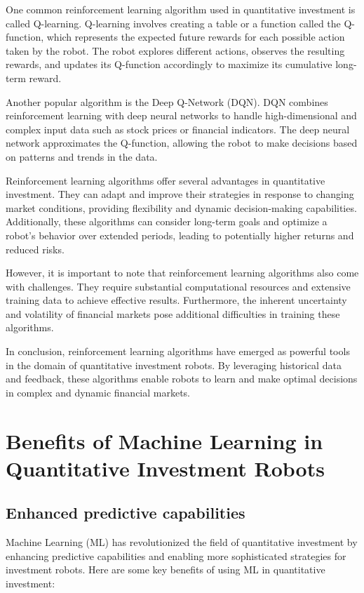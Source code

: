 \documentclass[UTF8]{ctexart}
\begin{document}
One common reinforcement learning algorithm used in quantitative investment is called Q-learning. Q-learning involves creating a table or a function called the Q-function, which represents the expected future rewards for each possible action taken by the robot. The robot explores different actions, observes the resulting rewards, and updates its Q-function accordingly to maximize its cumulative long-term reward.

Another popular algorithm is the Deep Q-Network (DQN). DQN combines reinforcement learning with deep neural networks to handle high-dimensional and complex input data such as stock prices or financial indicators. The deep neural network approximates the Q-function, allowing the robot to make decisions based on patterns and trends in the data.

Reinforcement learning algorithms offer several advantages in quantitative investment. They can adapt and improve their strategies in response to changing market conditions, providing flexibility and dynamic decision-making capabilities. Additionally, these algorithms can consider long-term goals and optimize a robot's behavior over extended periods, leading to potentially higher returns and reduced risks.

However, it is important to note that reinforcement learning algorithms also come with challenges. They require substantial computational resources and extensive training data to achieve effective results. Furthermore, the inherent uncertainty and volatility of financial markets pose additional difficulties in training these algorithms.

In conclusion, reinforcement learning algorithms have emerged as powerful tools in the domain of quantitative investment robots. By leveraging historical data and feedback, these algorithms enable robots to learn and make optimal decisions in complex and dynamic financial markets.



\section{Benefits of Machine Learning in Quantitative Investment Robots}
\subsection{Enhanced predictive capabilities}
Machine Learning (ML) has revolutionized the field of quantitative investment by enhancing predictive capabilities and enabling more sophisticated strategies for investment robots. Here are some key benefits of using ML in quantitative investment:
\end{document}
